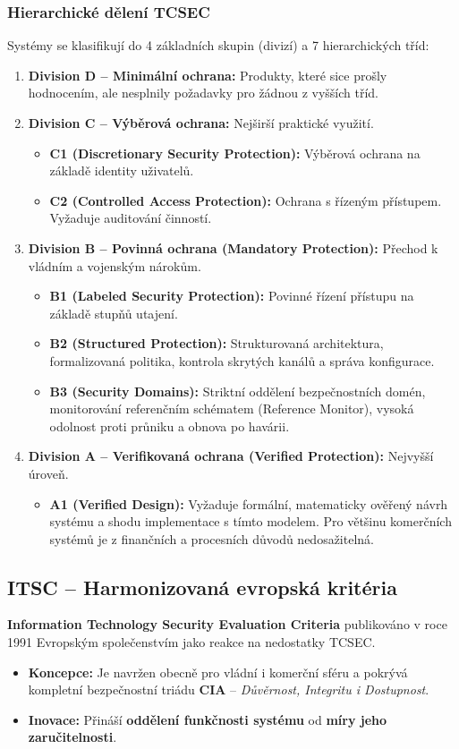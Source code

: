 \documentclass[10pt,a4paper]{article}
\begin{document}
	\subsubsection*{Hierarchické dělení TCSEC}
	Systémy se klasifikují do 4 základních skupin (divizí) a 7 hierarchických tříd:
	\begin{enumerate}
		\item \textbf{Division D -- Minimální ochrana:} Produkty, které sice prošly hodnocením, ale nesplnily požadavky pro žádnou z vyšších tříd.
		\item \textbf{Division C -- Výběrová ochrana:} Nejširší praktické využití.
		\begin{itemize}
			\item \textbf{C1 (Discretionary Security Protection):} Výběrová ochrana na základě identity uživatelů.
			\item \textbf{C2 (Controlled Access Protection):} Ochrana s řízeným přístupem. Vyžaduje auditování činností.
		\end{itemize}
		\item \textbf{Division B -- Povinná ochrana (Mandatory Protection):} Přechod k vládním a vojenským nárokům.
		\begin{itemize}
			\item \textbf{B1 (Labeled Security Protection):} Povinné řízení přístupu na základě stupňů utajení.
			\item \textbf{B2 (Structured Protection):} Strukturovaná architektura, formalizovaná politika, kontrola skrytých kanálů a správa konfigurace.
			\item \textbf{B3 (Security Domains):} Striktní oddělení bezpečnostních domén, monitorování referenčním schématem (Reference Monitor), vysoká odolnost proti průniku a obnova po havárii.
		\end{itemize}
		\item \textbf{Division A -- Verifikovaná ochrana (Verified Protection):} Nejvyšší úroveň.
		\begin{itemize}
			\item \textbf{A1 (Verified Design):} Vyžaduje formální, matematicky ověřený návrh systému a shodu implementace s tímto modelem. Pro většinu komerčních systémů je z finančních a procesních důvodů nedosažitelná.
		\end{itemize}
	\end{enumerate}
	
	\subsection{ITSC -- Harmonizovaná evropská kritéria}
	\textbf{Information Technology Security Evaluation Criteria} publikováno v roce 1991 Evropským společenstvím jako reakce na nedostatky TCSEC.
	\begin{itemize}
		\item \textbf{Koncepce:} Je navržen obecně pro vládní i komerční sféru a pokrývá kompletní bezpečnostní triádu \textbf{CIA} -- \textit{Důvěrnost, Integritu i Dostupnost}.
		\item \textbf{Inovace:} Přináší \textbf{oddělení funkčnosti systému} od \textbf{míry jeho zaručitelnosti}.
	\end{itemize}
	
\end{document}
